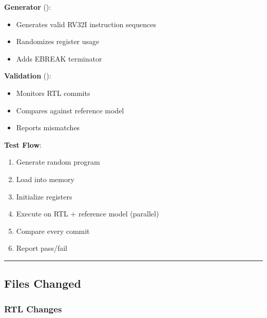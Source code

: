 \begin{record}

\textbf{Generator} ():

\begin{itemize}
\tightlist
\item
  Generates valid RV32I instruction sequences
\item
  Randomizes register usage
\item
  Adds EBREAK terminator
\end{itemize}

\textbf{Validation} ():

\begin{itemize}
\tightlist
\item
  Monitors RTL commits
\item
  Compares against reference model
\item
  Reports mismatches
\end{itemize}

\textbf{Test Flow}:

\begin{enumerate}
\def\labelenumi{\arabic{enumi}.}
\tightlist
\item
  Generate random program
\item
  Load into memory
\item
  Initialize registers
\item
  Execute on RTL + reference model (parallel)
\item
  Compare every commit
\item
  Report pass/fail
\end{enumerate}

\begin{center}\rule{0.5\linewidth}{0.5pt}\end{center}

\end{record}

\subsection{Files Changed}\label{cr:app:archive-session-summary:files-changed}

\subsubsection{RTL Changes}\label{cr:app:archive-session-summary:rtl-changes}

